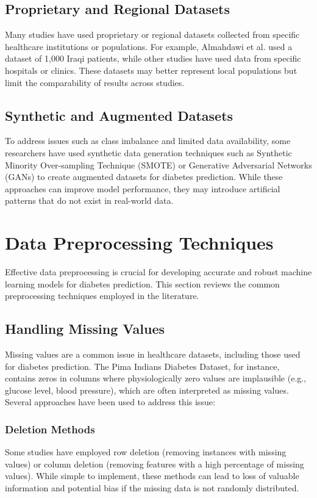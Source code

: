 \documentclass[journal]{IEEEtran}
\begin{document}
\subsection{Proprietary and Regional Datasets}
Many studies have used proprietary or regional datasets collected from specific healthcare institutions or populations. For example, Almahdawi et al. \cite{almahdawi2023} used a dataset of 1,000 Iraqi patients, while other studies have used data from specific hospitals or clinics. These datasets may better represent local populations but limit the comparability of results across studies.

\subsection{Synthetic and Augmented Datasets}
To address issues such as class imbalance and limited data availability, some researchers have used synthetic data generation techniques such as Synthetic Minority Over-sampling Technique (SMOTE) or Generative Adversarial Networks (GANs) to create augmented datasets for diabetes prediction. While these approaches can improve model performance, they may introduce artificial patterns that do not exist in real-world data.

\section{Data Preprocessing Techniques}
Effective data preprocessing is crucial for developing accurate and robust machine learning models for diabetes prediction. This section reviews the common preprocessing techniques employed in the literature.

\subsection{Handling Missing Values}
Missing values are a common issue in healthcare datasets, including those used for diabetes prediction. The Pima Indians Diabetes Dataset, for instance, contains zeros in columns where physiologically zero values are implausible (e.g., glucose level, blood pressure), which are often interpreted as missing values. Several approaches have been used to address this issue:

\subsubsection{Deletion Methods}
Some studies have employed row deletion (removing instances with missing values) or column deletion (removing features with a high percentage of missing values). While simple to implement, these methods can lead to loss of valuable information and potential bias if the missing data is not randomly distributed.
\end{document}
